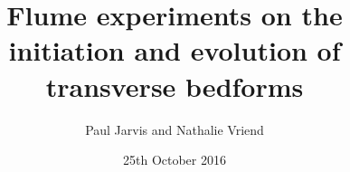 \documentclass{beamer}
\title[Dune formation]{Flume experiments on the initiation and evolution of transverse bedforms} %
\author[Paul Jarvis]{Paul Jarvis and Nathalie Vriend} %
\institute[UoC] %
{
  Department of Applied Mathematics and Theoretical Physics\\
  University of Cambridge
 \\ %
\medskip
\textit{paj35@cam.ac.uk} %
}
\date{25th October 2016} %
\begin{document}
\begin{frame}
\titlepage %
\end{frame}




\end{document}

